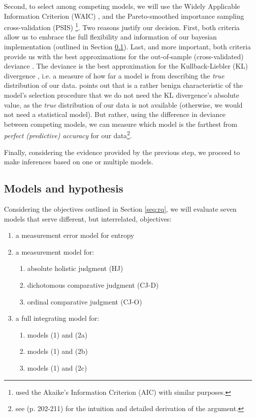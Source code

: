 Second, to select among competing models, we will use the Widely Applicable Information Criterion (WAIC) \citep{Watanabe_2013}, and the Pareto-smoothed importance sampling cross-validation (PSIS) \citep{Vehtari_et_al_2021}\footnote{\citet{vanDaal_2020} used the Akaike’s Information Criterion (AIC) \citep{Akaike_1974} with similar purposes.}. Two reasons justify our decision. First, both criteria allow us to embrace the full flexibility and information of our bayesian implementation (outlined in Section \ref{s_sect:models}). Last, and more important, both criteria provide us with the best approximations for the out-of-sample (cross-validated) deviance \citep{McElreath_2020}. The deviance is the best approximation for the Kullback-Liebler (KL) divergence \citep{Kullback_et_al_1951}, i.e. a measure of how far a model is from describing the \textit{true} distribution of our data. \citet{McElreath_2020} points out that is a rather benign characteristic of the model's selection procedure that we do not need the KL divergence's absolute value, as the \textit{true} distribution of our data is not available (otherwise, we would not need a statistical model). But rather, using the difference in deviance between competing models, we can measure which model is the farthest from \textit{perfect (predictive) accuracy} for our data\footnote{see \citet{McElreath_2020} (p. 202-211) for the intuition and detailed derivation of the argument.}.

Finally, considering the evidence provided by the previous step, we proceed to make inferences based on one or multiple models.
%
%
\subsection{Models and hypothesis} \label{s_sect:models}
%
Considering the objectives outlined in Section \ref{seq:rq}, we will evaluate seven models that serve different, but interrelated, objectives:
%
\begin{enumerate} \itemsep1pt
	\item[(1)] a measurement error model for entropy
	\item[(2)] a measurement model for: 
	\begin{enumerate} \itemsep1pt
		\item absolute holistic judgment (HJ)
		\item dichotomous comparative judgment (CJ-D)
		\item ordinal comparative judgment (CJ-O)
	\end{enumerate}
	\item[(3)] a full integrating model for: 
	\begin{enumerate} \itemsep1pt
		\item models (1) and (2a)
		\item models (1) and (2b)
		\item models (1) and (2c)
	\end{enumerate}
\end{enumerate} 
%
%
